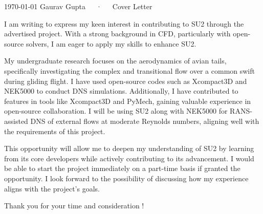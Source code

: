 \documentclass[11pt, a4paper]{../awesome-cv}
\begin{document}
\makecvheader[R]

\makecvfooter
  {\today}
  {Gaurav Gupta~~~·~~~Cover Letter}
  {}

\makelettertitle

\begin{cvletter}
I am writing to express my keen interest in contributing to SU2 through the advertised project. With a strong background in CFD, particularly with open-source solvers, I am eager to apply my skills to enhance SU2.

My undergraduate research focuses on the aerodynamics of avian tails, specifically investigating the complex and transitional flow over a common swift during gliding flight. I have used open-source codes such as Xcompact3D and NEK5000 to conduct DNS simulations. Additionally, I have contributed to features in tools like Xcompact3D and PyMech, gaining valuable experience in open-source collaboration. I will be using SU2 along with NEK5000 for RANS-assisted DNS of external flows at moderate Reynolds numbers, aligning well with the requirements of this project.

This opportunity will allow me to deepen my understanding of SU2 by learning from its core developers while actively contributing to its advancement. I would be able to start the project immediately on a part-time basis if granted the opportunity. I look forward to the possibility of discussing how my experience aligns with the project's goals. 

Thank you for your time and consideration !
\end{cvletter}


\makeletterclosing
\end{document}
